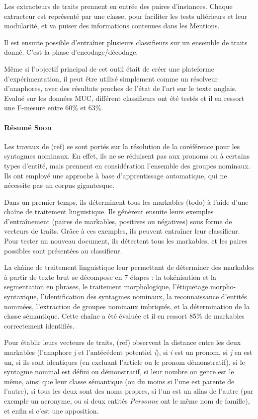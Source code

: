 \documentclass[a4paper,12pt]{article}
\begin{document}
Les extracteurs de traits prennent en entrée des paires d'instances. Chaque extracteur est représenté par une classe, pour faciliter les tests ultérieurs et leur modularité, et va puiser des informations contenues dans les Mentions.

Il est ensuite possible d'entraîner plusieurs classifieurs sur un ensemble de traits donné. C'est la phase d'encodage/décodage.

Même si l'objectif principal de cet outil était de créer une plateforme d'expérimentation, il peut être utilisé simplement comme un résolveur d'anaphores, avec des résultats proches de l'état de l'art sur le texte anglais. Evalué sur les données MUC, différent classifieurs ont été testés et il en ressort une F-mesure entre 60\% et 63\%.


\paragraph{Résumé Soon}
Les travaux de (ref) se sont portés sur la résolution de la coréférence pour les syntagmes nominaux. En effet, ils ne se réduisent pas aux pronoms ou à certains types d'entité, mais prennent en considération l'ensemble des groupes nominaux. Ils ont employé une approche à base d'apprentissage automatique, qui ne nécessite pas un corpus gigantesque.

Dans un premier temps, ils déterminent tous les markables (todo) à l'aide d'une cha\^ine de traitement linguistique. Ils génèrent ensuite leurs exemples d'entra\^inement (paires de markables, positives ou négatives) sous forme de vecteurs de traits. Gr\^ace à ces exemples, ils peuvent entra\^iner leur classifieur. Pour tester un nouveau document, ils détectent tous les markables, et les paires possibles sont présentées au classifieur.

La ch\^aine de traitement linguistique leur permettant de déterminer des markables à partir de texte brut se décompose en 7 étapes : la tokénisation et la segmentation en phrases, le traitement morphologique, l'étiquetage morpho-syntaxique, l'identification des syntagmes nominaux, la reconnaissance d'entités nommées, l'extraction de groupes nominaux imbriqués, et la détermination de la classe sémantique. Cette cha\^ine a été évaluée et il en ressort 85\% de markables correctement identifiés.

Pour établir leurs vecteurs de traits, (ref) observent la distance entre les deux markables (l'anaphore \textit{j} et l'antécédent potentiel \textit{i}), si \textit{i} est un pronom, si \textit{j} en est un, si ils sont identiques (en excluant l'article ou le pronom démonstratif), si le syntagme nominal est défini ou démonstratif, si leur nombre ou genre est le m\^eme, ainsi que leur classe sémantique (ou du moins si l'une est parente de l'autre), si tous les deux sont des noms propres, si l'un est un alias de l'autre (par exemple un acronyme, ou si deux entités \textit{Personne} ont le m\^eme nom de famille), et enfin si c'est une apposition.
\end{document}
